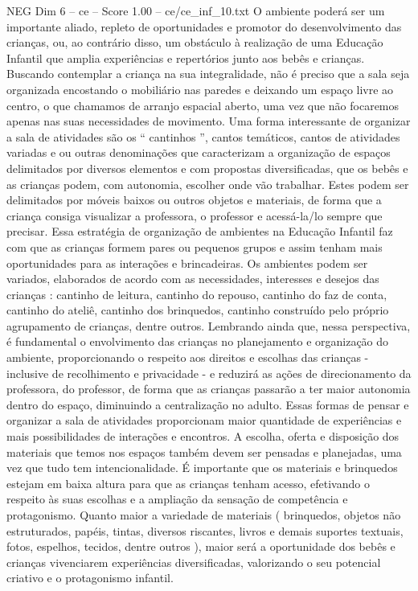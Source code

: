 \begin{textsample}{NEG Dim 6 – ce – Score 1.00 – ce/ce\_inf\_10.txt}
O ambiente poderá ser um importante aliado, repleto de oportunidades e promotor do desenvolvimento das crianças, ou, ao contrário disso, um obstáculo à realização de uma Educação Infantil que amplia experiências e repertórios junto aos bebês e crianças.
Buscando contemplar a criança na sua integralidade, não é preciso que a sala seja organizada encostando o mobiliário nas paredes e deixando um espaço livre ao centro, o que chamamos de arranjo espacial aberto, uma vez que não focaremos apenas nas suas necessidades de movimento.
Uma forma interessante de organizar a sala de atividades são os “ cantinhos ”, cantos temáticos, cantos de atividades variadas e ou outras denominações que caracterizam a organização de espaços delimitados por diversos elementos e com propostas diversificadas, que os bebês e as crianças podem, com autonomia, escolher onde vão trabalhar.
Estes podem ser delimitados por móveis baixos ou outros objetos e materiais, de forma que a criança consiga visualizar a professora, o professor e acessá-la/lo sempre que precisar.
Essa estratégia de organização de ambientes na Educação Infantil faz com que as crianças formem pares ou pequenos grupos e assim tenham mais oportunidades para as interações e brincadeiras.
Os ambientes podem ser variados, elaborados de acordo com as necessidades, interesses e desejos das crianças : cantinho de leitura, cantinho do repouso, cantinho do faz de conta, cantinho do ateliê, cantinho dos brinquedos, cantinho construído pelo próprio agrupamento de crianças, dentre outros.
Lembrando ainda que, nessa perspectiva, é fundamental o envolvimento das crianças no planejamento e organização do ambiente, proporcionando o respeito aos direitos e escolhas das crianças - inclusive de recolhimento e privacidade - e reduzirá as ações de direcionamento da professora, do professor, de forma que as crianças passarão a ter maior autonomia dentro do espaço, diminuindo a centralização no adulto.
Essas formas de pensar e organizar a sala de atividades proporcionam maior quantidade de experiências e mais possibilidades de interações e encontros.
A escolha, oferta e disposição dos materiais que temos nos espaços também devem ser pensadas e planejadas, uma vez que tudo tem intencionalidade.
É importante que os materiais e brinquedos estejam em baixa altura para que as crianças tenham acesso, efetivando o respeito às suas escolhas e a ampliação da sensação de competência e protagonismo.
Quanto maior a variedade de materiais ( brinquedos, objetos não estruturados, papéis, tintas, diversos riscantes, livros e demais suportes textuais, fotos, espelhos, tecidos, dentre outros ), maior será a oportunidade dos bebês e crianças vivenciarem experiências diversificadas, valorizando o seu potencial criativo e o protagonismo infantil.

\end{textsample}

